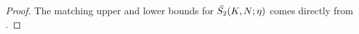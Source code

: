 \begin{proof}
The matching upper and lower bounds for $\Tilde{S_2}(K, N;\eta)$ comes directly from .
\end{proof}

